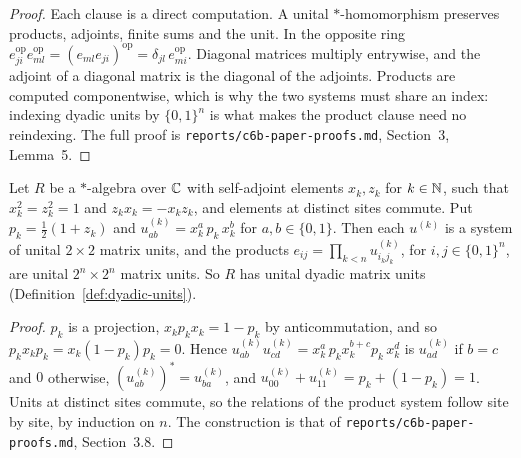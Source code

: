 \begin{proof}
\leanok
Each clause is a direct computation. A unital $*$-homomorphism preserves products, adjoints, finite
sums and the unit. In the opposite ring $e_{ji}^{\mathrm{op}} e_{ml}^{\mathrm{op}} = (e_{ml}
e_{ji})^{\mathrm{op}} = \delta_{jl}\, e_{mi}^{\mathrm{op}}$. Diagonal matrices multiply entrywise,
and the adjoint of a diagonal matrix is the diagonal of the adjoints. Products are computed
componentwise, which is why the two systems must share an index: indexing dyadic units by
$\{0, 1\}^n$ is what makes the product clause need no reindexing. The full proof is
\texttt{reports/c6b-paper-proofs.md}, Section~3, Lemma~5.
\end{proof}

\begin{lemma}
\label{lem:pauli-sites-units}
\leanok
Let $R$ be a $*$-algebra over $\mathbb{C}$ with self-adjoint elements $x_k, z_k$ for $k \in \mathbb{N}$, such that
$x_k^2 = z_k^2 = 1$ and $z_k x_k = -x_k z_k$, and elements at distinct sites commute. Put $p_k =
\frac12 (1 + z_k)$ and $u^{(k)}_{ab} = x_k^a\, p_k\, x_k^b$ for $a, b \in \{0, 1\}$. Then each
$u^{(k)}$ is a system of unital $2 \times 2$ matrix units, and the products $e_{ij} = \prod_{k < n}
u^{(k)}_{i_k j_k}$, for $i, j \in \{0, 1\}^n$, are unital $2^n \times 2^n$ matrix units. So $R$ has
unital dyadic matrix units (Definition~\ref{def:dyadic-units}).
\end{lemma}

\begin{proof}
\leanok
$p_k$ is a projection, $x_k p_k x_k = 1 - p_k$ by anticommutation, and so $p_k x_k p_k = x_k (1 -
p_k) p_k = 0$. Hence $u^{(k)}_{ab} u^{(k)}_{cd} = x_k^a\, p_k x_k^{b + c} p_k\, x_k^d$ is
$u^{(k)}_{ad}$ if $b = c$ and $0$ otherwise, $(u^{(k)}_{ab})^* = u^{(k)}_{ba}$, and $u^{(k)}_{00} +
u^{(k)}_{11} = p_k + (1 - p_k) = 1$. Units at distinct sites commute, so the relations of the
product system follow site by site, by induction on $n$. The construction is that of
\texttt{reports/c6b-paper-proofs.md}, Section~3.8.
\end{proof}

